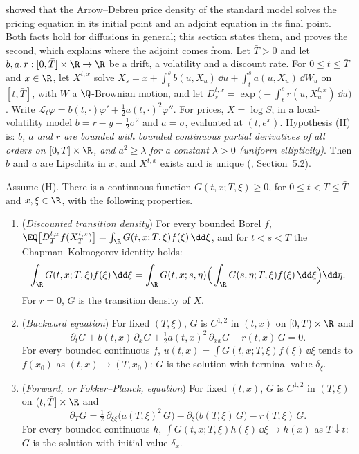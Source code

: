  showed that the Arrow--Debreu price density of the standard model solves the pricing
equation in its initial point and an adjoint equation in its final point. Both facts hold for diffusions in
general; this section states them, and proves the second, which explains where the adjoint comes from.
Let $\bar T>0$ and let $b,a,r:[0,\bar T]\times\R\to\R$ be a drift, a volatility and a discount rate. For $0\le t\le\bar T$ and $x\in\R$, let $X^{t,x}$ solve
$X_s=x+\int_t^sb(u,X_u)\,\dd u+\int_t^sa(u,X_u)\,\dd W_u$ on $[t,\bar T]$, with $W$ a $\Q$-Brownian motion, and let
$D^{t,x}_s=\exp\big(-\int_t^sr(u,X^{t,x}_u)\,\dd u\big)$. Write $\mathcal L_t\varphi=b(t,\cdot)\varphi'+\frac12a(t,\cdot)^2\varphi''$.
For prices, $X=\log S$; in a local-volatility model $b=r-y-\frac12\sigma^2$ and $a=\sigma$, evaluated at $(t,e^x)$.
Hypothesis (H) is: \emph{$b$, $a$ and $r$ are bounded with bounded continuous partial derivatives of all
orders on $[0,\bar T]\times\R$, and $a^2\ge\lambda$ for a constant $\lambda>0$ (uniform ellipticity)}. Then $b$ and $a$
are Lipschitz in $x$, and $X^{t,x}$ exists and is unique (\textcite{karatzas-shreve}, Section~5.2).

\begin{theorem}\label{thm:sr-kolmogorov}
Assume (H). There is a continuous function $G(t,x;T,\xi)\ge0$, for $0\le t<T\le\bar T$ and $x,\xi\in\R$, with the
following properties.
\begin{enumerate}[label=(\roman*)]
  \item (\emph{Discounted transition density}) For every bounded Borel $f$,
    $\EQ\big[D^{t,x}_Tf(X^{t,x}_T)\big]=\int_\R G(t,x;T,\xi)f(\xi)\,\dd\xi$, and for $t<s<T$ the
    Chapman--Kolmogorov identity holds:
    \begin{equation}\label{eq:sr-ck}
      \int_\R G(t,x;T,\xi)f(\xi)\,\dd\xi=\int_\R G(t,x;s,\eta)\Big(\int_\R G(s,\eta;T,\xi)f(\xi)\,\dd\xi\Big)\dd\eta .
    \end{equation}
    For $r=0$, $G$ is the transition density of $X$.
  \item (\emph{Backward equation}) For fixed $(T,\xi)$, $G$ is $C^{1,2}$ in $(t,x)$ on $[0,T)\times\R$ and
    \begin{equation}\label{eq:sr-backward}
      \partial_tG+b(t,x)\,\partial_xG+\tfrac12a(t,x)^2\,\partial_{xx}G-r(t,x)\,G=0 .
    \end{equation}
    For every bounded continuous $f$, $u(t,x)=\int G(t,x;T,\xi)f(\xi)\,\dd\xi$ tends to $f(x_0)$ as
    $(t,x)\to(T,x_0)$: $G$ is the solution with terminal value $\delta_\xi$.
  \item (\emph{Forward, or Fokker--Planck, equation}) For fixed $(t,x)$, $G$ is $C^{1,2}$ in $(T,\xi)$ on $(t,\bar T]\times\R$ and
    \begin{equation}\label{eq:sr-forward}
      \partial_TG=\tfrac12\,\partial_{\xi\xi}\big(a(T,\xi)^2\,G\big)-\partial_\xi\big(b(T,\xi)\,G\big)-r(T,\xi)\,G .
    \end{equation}
    For every bounded continuous $h$, $\int G(t,x;T,\xi)h(\xi)\,\dd\xi\to h(x)$ as $T\downarrow t$: $G$ is the solution
    with initial value $\delta_x$.
\end{enumerate}
\end{theorem}

